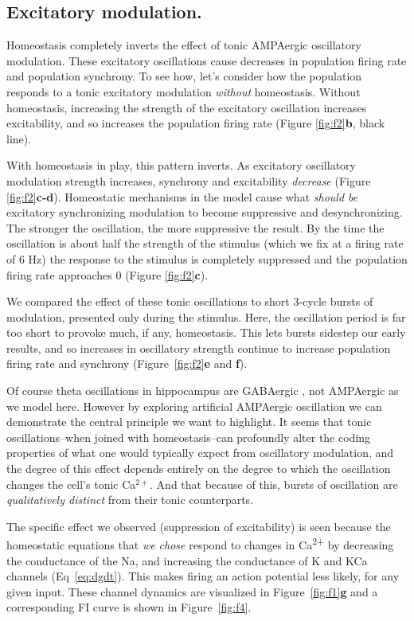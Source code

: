 \documentclass{article}
\begin{document}
\subsection*{Excitatory modulation.}
Homeostasis completely inverts the effect of tonic AMPAergic oscillatory modulation. These excitatory oscillations cause decreases in population firing rate and population synchrony. To see how, let's consider how the population responds to a tonic excitatory modulation \textit{without} homeostasis. Without homeostasis, increasing the strength of the excitatory oscillation increases excitability, and so increases the population firing rate (Figure \ref{fig:f2}\textbf{b}, black line). 

With homeostasis in play, this pattern inverts. As excitatory oscillatory modulation strength increases, synchrony and excitability \emph{decrease} (Figure \ref{fig:f2}\textbf{c-d}). Homeostatic mechanisms in the model cause what \emph{should be} excitatory synchronizing modulation to become suppressive and desynchronizing. The stronger the oscillation, the more suppressive the result. By the time the oscillation is about half the strength of the stimulus (which we fix at a firing rate of 6 Hz) the response to the stimulus is completely suppressed and the population firing rate approaches 0 (Figure \ref{fig:f2}\textbf{c}).

We compared the effect of these tonic oscillations to short 3-cycle bursts of modulation, presented only during the stimulus. Here, the oscillation period is far too short to provoke much, if any, homeostasis. This lets bursts sidestep our early results, and so increases in oscillatory strength continue to increase population firing rate and synchrony (Figure~\ref{fig:f2}\textbf{e} and \textbf{f}).

Of course theta oscillations in hippocampus are GABAergic \cite{Colgin2016}, not AMPAergic as we model here. However by exploring artificial AMPAergic oscillation we can demonstrate the central principle we want to highlight. It seems that tonic oscillations--when joined with homeostasis--can profoundly alter the coding properties of what one would typically expect from oscillatory modulation, and the degree of this effect depends entirely on the degree to which the oscillation changes the cell's tonic Ca$^{2+}$. And that because of this, bursts of oscillation are \textit{qualitatively distinct} from their tonic counterparts.  

The specific effect we observed (suppression of excitability) is seen because the homeostatic equations that \textit{we chose} respond to changes in Ca\textsuperscript{2+} by decreasing the conductance of the Na, and increasing the conductance of K and KCa channels (Eq~\ref{eq:dgdt}). This makes firing an action potential less likely, for any given input. These channel dynamics are visualized in Figure~\ref{fig:f1}\textbf{g} and a corresponding FI curve is shown in Figure~\ref{fig:f4}. 
\end{document}
